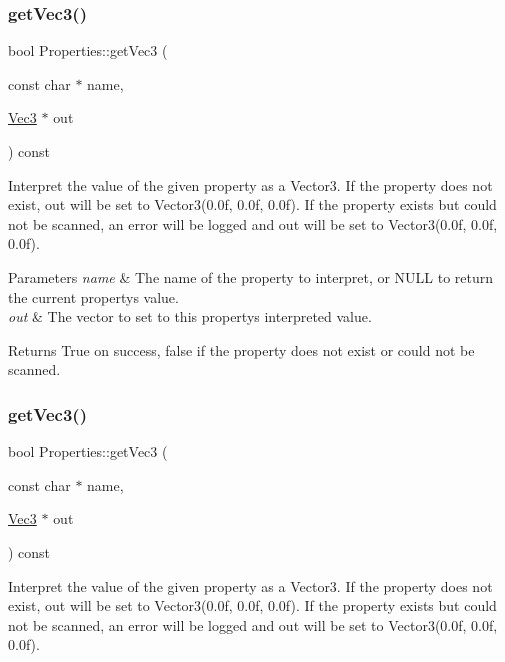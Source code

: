 \subsubsection{\texorpdfstring{get\+Vec3()}{getVec3()}\hspace{0.1cm}{\footnotesize\ttfamily [1/2]}}
{\footnotesize\ttfamily bool Properties\+::get\+Vec3 (\begin{DoxyParamCaption}\item[{const char $\ast$}]{name,  }\item[{\hyperlink{classVec3}{Vec3} $\ast$}]{out }\end{DoxyParamCaption}) const}

Interpret the value of the given property as a Vector3. If the property does not exist, out will be set to Vector3(0.\+0f, 0.\+0f, 0.\+0f). If the property exists but could not be scanned, an error will be logged and out will be set to Vector3(0.\+0f, 0.\+0f, 0.\+0f).


\begin{DoxyParams}{Parameters}
{\em name} & The name of the property to interpret, or N\+U\+LL to return the current property\textquotesingle{}s value. \\
\hline
{\em out} & The vector to set to this property\textquotesingle{}s interpreted value.\\
\hline
\end{DoxyParams}
\begin{DoxyReturn}{Returns}
True on success, false if the property does not exist or could not be scanned. 
\end{DoxyReturn}
\mbox{\label{classProperties_a5ea69d8939c4f73a4f271c5ebc1ff718}} 
\subsubsection{\texorpdfstring{get\+Vec3()}{getVec3()}\hspace{0.1cm}{\footnotesize\ttfamily [2/2]}}
{\footnotesize\ttfamily bool Properties\+::get\+Vec3 (\begin{DoxyParamCaption}\item[{const char $\ast$}]{name,  }\item[{\hyperlink{classVec3}{Vec3} $\ast$}]{out }\end{DoxyParamCaption}) const}

Interpret the value of the given property as a Vector3. If the property does not exist, out will be set to Vector3(0.\+0f, 0.\+0f, 0.\+0f). If the property exists but could not be scanned, an error will be logged and out will be set to Vector3(0.\+0f, 0.\+0f, 0.\+0f).


